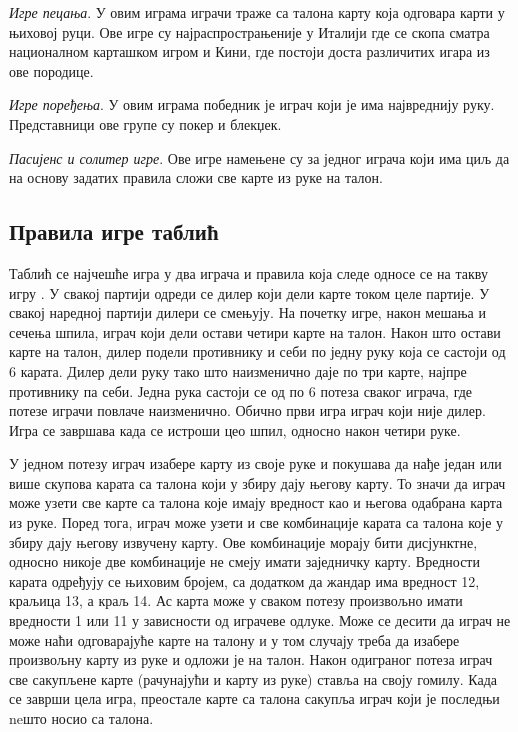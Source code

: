 \documentclass[a4paper, 12pt, ngerman]{article}
\let\oldsubsection\subsection
\renewcommand\subsection{\clearpage\oldsubsection}
\begin{document}
\textit{Игре пецања}. У овим играма играчи траже са талона карту која одговара карти у њиховој руци. Ове игре су најраспрострањеније у Италији где се скопа сматра националном карташком игром и Кини, где постоји доста различитих игара из ове породице.

\textit{Игре поређења}. У овим играма победник је играч који је има највреднију руку. Представници ове групе су покер и блекџек.

\textit{Пасијенс и солитер игре}. Ове игре намењене су за једног играча који има циљ да на основу задатих правила сложи све карте из руке на талон.



\subsection{Правила игре таблић}
Таблић се најчешће игра у два играча и правила која следе односе се на такву игру \cite{tablicpravila}. У свакој партији одреди се дилер који дели карте током целе партије. У свакој наредној партији дилери се смењују. На почетку игре, након мешања и сечења шпила, играч који дели остави четири карте на талон. Након што остави карте на талон, дилер подели противнику и себи по једну руку која се састоји од 6 карата. Дилер дели руку тако што наизменично даје по три карте, најпре противнику па себи. Једна рука састоји се од по 6 потеза сваког играча, где потезе играчи повлаче наизменично. Обично први игра играч који није дилер. Игра се завршава када се истроши цео шпил, односно након четири руке.

У једном потезу играч изабере карту из своје руке и покушава да нађе један или више скупова карата са талона који у збиру дају његову карту. То значи да играч може узети све карте са талона које имају вредност као и његова одабрана карта из руке. Поред тога, играч може узети и све комбинације карата са талона које у збиру дају његову извучену карту. Ове комбинације морају бити дисјунктне, односно никоје две комбинације не смеју имати заједничку карту. Вредности карата одређују се њиховим бројем, са додатком да жандар има вредност 12, краљица 13, а краљ 14. Ас карта може у сваком потезу произвољно имати вредности 1 или 11 у зависности од играчеве одлуке. Може се десити да играч не може наћи одговарајуће карте на талону и у том случају треба да изабере произвољну карту из руке и одложи је на талон. Након одиграног потеза играч све сакупљене карте (рачунајући и карту из руке) ставља на своју гомилу. Када се заврши цела игра, преостале карте са талона сакупља играч који је последњи neшто носио са талона.
\end{document}
